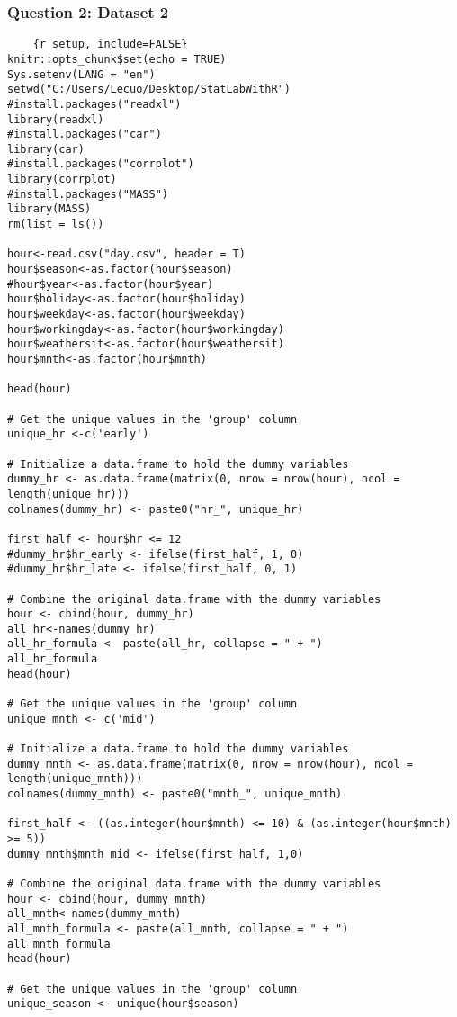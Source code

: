 \subsubsection{Question 2: Dataset 2}

\begin{lstlisting}
    {r setup, include=FALSE}
knitr::opts_chunk$set(echo = TRUE)
Sys.setenv(LANG = "en")
setwd("C:/Users/Lecuo/Desktop/StatLabWithR")
#install.packages("readxl")
library(readxl)
#install.packages("car")
library(car)
#install.packages("corrplot")
library(corrplot)
#install.packages("MASS")
library(MASS)
rm(list = ls())

hour<-read.csv("day.csv", header = T)
hour$season<-as.factor(hour$season)
#hour$year<-as.factor(hour$year)
hour$holiday<-as.factor(hour$holiday)
hour$weekday<-as.factor(hour$weekday)
hour$workingday<-as.factor(hour$workingday)
hour$weathersit<-as.factor(hour$weathersit)
hour$mnth<-as.factor(hour$mnth)

head(hour)

# Get the unique values in the 'group' column
unique_hr <-c('early')

# Initialize a data.frame to hold the dummy variables
dummy_hr <- as.data.frame(matrix(0, nrow = nrow(hour), ncol = length(unique_hr)))
colnames(dummy_hr) <- paste0("hr_", unique_hr)

first_half <- hour$hr <= 12
#dummy_hr$hr_early <- ifelse(first_half, 1, 0)
#dummy_hr$hr_late <- ifelse(first_half, 0, 1)

# Combine the original data.frame with the dummy variables
hour <- cbind(hour, dummy_hr)
all_hr<-names(dummy_hr)
all_hr_formula <- paste(all_hr, collapse = " + ")
all_hr_formula
head(hour)

# Get the unique values in the 'group' column
unique_mnth <- c('mid')

# Initialize a data.frame to hold the dummy variables
dummy_mnth <- as.data.frame(matrix(0, nrow = nrow(hour), ncol = length(unique_mnth)))
colnames(dummy_mnth) <- paste0("mnth_", unique_mnth)

first_half <- ((as.integer(hour$mnth) <= 10) & (as.integer(hour$mnth) >= 5))
dummy_mnth$mnth_mid <- ifelse(first_half, 1,0)

# Combine the original data.frame with the dummy variables
hour <- cbind(hour, dummy_mnth)
all_mnth<-names(dummy_mnth)
all_mnth_formula <- paste(all_mnth, collapse = " + ")
all_mnth_formula
head(hour)

# Get the unique values in the 'group' column
unique_season <- unique(hour$season)


\end{lstlisting}
